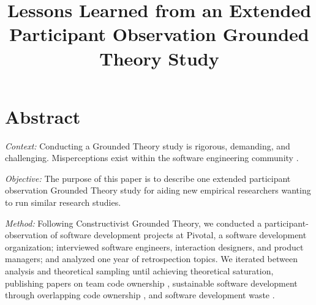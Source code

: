 
\title{Lessons Learned from an Extended Participant Observation Grounded Theory Study}

\author{
\and
{}
\and
{}
}
\maketitle

\section*{Abstract}
\textit{Context:} Conducting a Grounded Theory study is rigorous, demanding, and challenging. Misperceptions exist within the software engineering community \cite{StolGroundedTheory}.

\textit{Objective:} The purpose of this paper is to describe one extended participant observation Grounded Theory study for aiding new empirical researchers wanting to run similar research studies.

\textit{Method:} Following Constructivist Grounded Theory, we conducted a \durationOfResearchStudy{} participant-observation of \numberOfObservedProjects{} software development projects at Pivotal, a software development organization; interviewed \numberOfInterviews{} software engineers, interaction designers, and product managers; and analyzed one year of retrospection topics. We iterated between analysis and theoretical sampling until achieving theoretical saturation, publishing papers on team code ownership \cite{SedanoTeamCodeOwnership}, sustainable software development through overlapping code ownership \cite{SedanoSustainableSoftware}, and software development waste \cite{SedanoSoftwareDevelopmentWaste}. 

